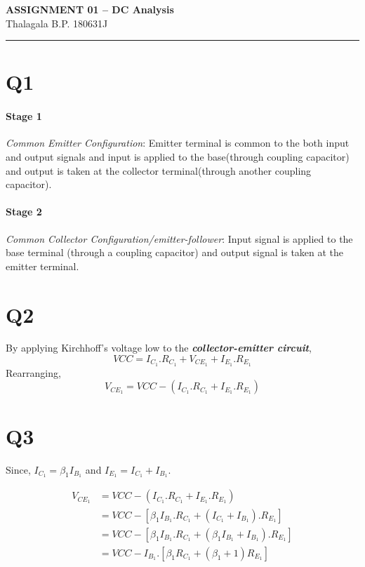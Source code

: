 \documentclass[legalpaper,11pt]{article}%
\begin{document}
	\begin{center}
		{\large \textbf{ASSIGNMENT 01 – DC Analysis}}\\
		Thalagala B.P.\hspace{0.5cm} 180631J 
	\end{center}
	\hrule

\section*{Q1}
\paragraph*{Stage 1} \textit{Common Emitter Configuration}: Emitter terminal is common to the both input and output signals and input is applied to the base(through coupling capacitor) and output is taken at the collector terminal(through another coupling capacitor).

\paragraph*{Stage 2} \textit{Common Collector Configuration/emitter-follower}: Input signal is applied to the base terminal (through a coupling capacitor)  and output signal is taken at the emitter terminal.

\section*{Q2}
By applying Kirchhoff's voltage low to the \textbf{\textit{collector-emitter circuit}},
\[VCC = I_{C_1}.R_{C_1} + V_{CE_1} + I_{E_1}.R_{E_1}\]
Rearranging, 
\[	 V_{CE_1}  = VCC -\left(I_{C_1}.R_{C_1} + I_{E_1}.R_{E_1} \right) \]

\section*{Q3}

Since, $I_{C_1} = \beta_1 I_{B_1}$ and $I_{E_1} = I_{C_1} + I_{B_1}$.

\[
\begin{split}
	V_{CE_1}  &= VCC -\left(I_{C_1}.R_{C_1} + I_{E_1}.R_{E_1} \right)\\
	&= VCC -\left[\beta_1 I_{B_1}.R_{C_1} + \left(I_{C_1} + I_{B_1} \right).R_{E_1} \right]\\
	&= VCC -\left[\beta_1 I_{B_1}.R_{C_1} + \left( \beta_1 I_{B_1} + I_{B_1} \right).R_{E_1} \right]\\
	& =  VCC -I_{B_1}.\left[\beta_1R_{C_1} + \left(\beta_1+1\right)R_{E_1} \right]
\end{split}	 
\]
\end{document}
